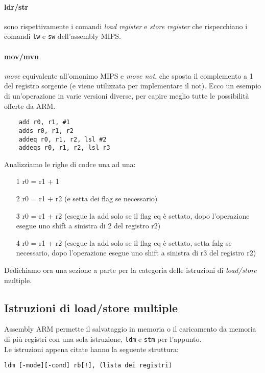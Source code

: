\documentclass[class=book, crop=false]{standalone}
\begin{document}
\paragraph*{ldr/str} sono rispettivamente i comandi \emph{load register} e \emph{store register} che rispecchiano i comandi \texttt{lw} e \texttt{sw} dell'assembly MIPS.
\paragraph*{mov/mvn} \emph{move} equivalente all'omonimo MIPS e \emph{move not}, che sposta il complemento a 1 del registro sorgente (e viene utilizzata per implementare il not).
Ecco un esempio di un'operazione in varie versioni diverse, per capire meglio tutte le possibilità offerte da ARM.\\

\begin{verbatim}
	add r0, r1, #1
	adds r0, r1, r2
	addeq r0, r1, r2, lsl #2
	addeqs r0, r1, r2, lsl r3
\end{verbatim}

Analizziamo le righe di codce una ad una:
\begin{itemize}
	\item [1] r0 = r1 + 1
	\item [2] r0 = r1 + r2 (e setta dei flag se necessario)
	\item [3] r0 = r1 + r2 (esegue la add solo se il flag eq è settato, dopo l'operazione esegue uno shift a sinistra di 2 del registro r2)
	\item [4] r0 = r1 + r2 (esegue la add solo se il flag eq è settato, setta falg se necessario, dopo l'operazione esegue uno shift a sinistra di r3 del registro r2)
\end{itemize}

Dedichiamo ora una sezione a parte per la categoria delle istruzioni di \emph{load/store} multiple.

\subsection*{Istruzioni di load/store multiple}
Assembly ARM permette il salvataggio in memoria o il caricamento da memoria di più registri con una sola istruzione, \texttt{ldm} e \texttt{stm} per l'appunto.\\
Le istruzioni appena citate hanno la seguente struttura:

\begin{verbatim}
ldm [-mode][-cond] rb[!], (lista dei registri)
\end{verbatim}
\end{document}

